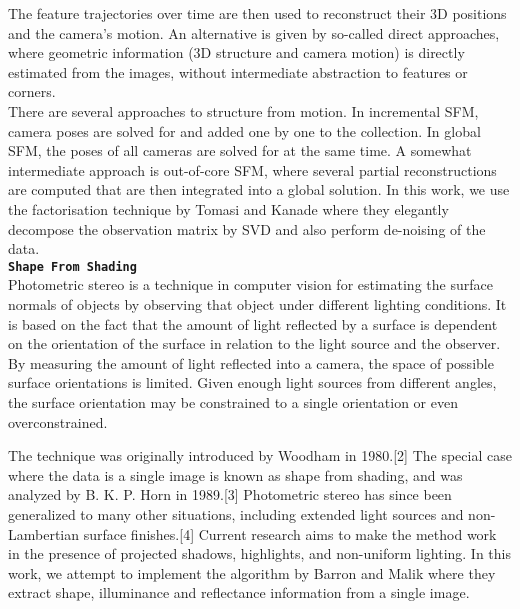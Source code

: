 \documentclass[preprint,12pt]{elsarticle}
\begin{document}
The feature trajectories over time are then used to reconstruct their 3D positions and the camera's motion. An alternative is given by so-called direct approaches, where geometric information (3D structure and camera motion) is directly estimated from the images, without intermediate abstraction to features or corners.\\

There are several approaches to structure from motion. In incremental SFM, camera poses are solved for and added one by one to the collection. In global SFM, the poses of all cameras are solved for at the same time. A somewhat intermediate approach is out-of-core SFM, where several partial reconstructions are computed that are then integrated into a global solution. In this work, we use the factorisation technique by Tomasi and Kanade where they elegantly decompose the observation matrix by SVD and also perform de-noising of the data.\\

\large{\texttt{\textbf{Shape From Shading}}}\\
Photometric stereo is a technique in computer vision for estimating the surface normals of objects by observing that object under different lighting conditions. It is based on the fact that the amount of light reflected by a surface is dependent on the orientation of the surface in relation to the light source and the observer. By measuring the amount of light reflected into a camera, the space of possible surface orientations is limited. Given enough light sources from different angles, the surface orientation may be constrained to a single orientation or even overconstrained.

The technique was originally introduced by Woodham in 1980.[2] The special case where the data is a single image is known as shape from shading, and was analyzed by B. K. P. Horn in 1989.[3] Photometric stereo has since been generalized to many other situations, including extended light sources and non-Lambertian surface finishes.[4] Current research aims to make the method work in the presence of projected shadows, highlights, and non-uniform lighting. In this work, we attempt to implement the algorithm by Barron and Malik where they extract shape, illuminance and reflectance information from a single image.\\

\end{document}
